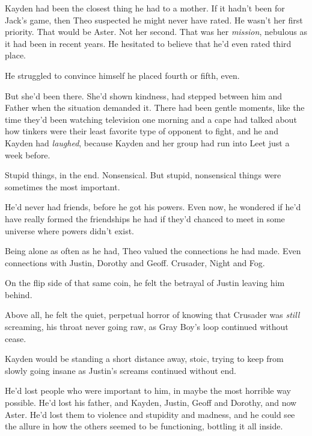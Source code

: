Kayden had been the closest thing he had to a mother.  If it hadn't been for Jack's game, then Theo suspected he might never have rated.  He wasn't her first priority.  That would be Aster.  Not her second.  That was her \emph{mission}, nebulous as it had been in recent years.  He hesitated to believe that he'd even rated third place.



He struggled to convince himself he placed fourth or fifth, even.



But she'd been there.  She'd shown kindness, had stepped between him and Father when the situation demanded it.  There had been gentle moments, like the time they'd been watching television one morning and a cape had talked about how tinkers were their least favorite type of opponent to fight, and he and Kayden had \emph{laughed}, because Kayden and her group had run into Leet just a week before.



Stupid things, in the end.  Nonsensical.  But stupid, nonsensical things were sometimes the most important.



He'd never had friends, before he got his powers.  Even now, he wondered if he'd have really formed the friendships he had if they'd chanced to meet in some universe where powers didn't exist.



Being alone as often as he had, Theo valued the connections he had made.  Even connections with Justin, Dorothy and Geoff.  Crusader, Night and Fog.



On the flip side of that same coin, he felt the betrayal of Justin leaving him behind.



Above all, he felt the quiet, perpetual horror of knowing that Crusader was \emph{still} screaming, his throat never going raw, as Gray Boy's loop continued without cease.



Kayden would be standing a short distance away, stoic, trying to keep from slowly going insane as Justin's screams continued without end.



He'd lost people who were important to him, in maybe the most horrible way possible.  He'd lost his father, and Kayden, Justin, Geoff and Dorothy, and now Aster.  He'd lost them to violence and stupidity and madness, and he could see the allure in how the others seemed to be functioning, bottling it all inside.



